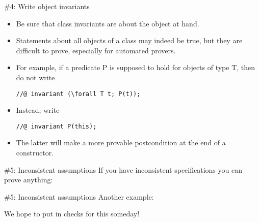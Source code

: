 \documentclass[
pdf,
nocolorBG,
slideColor,
cok,
]{prosper}
\newcommand{\verbatimcode}[1]{
\begin{figure*}
\tiny

\end{figure*}
}
\begin{document}
%%%%%%%%%%%%%%%%%%%%%%%%%%%%%%%%%%%%%%%%%%%%%%%%%%%%%%%%%%%%%%%%%%%%%%%%%%%%%

\begin{slide}{\#4: Write object invariants}
\vspace*{-6ex}
\begin{itemize}
\item Be sure that class invariants are about the object at hand.  
\item Statements about all objects of
a class may indeed be true, but they are difficult to prove, especially for automated provers.

\item For example, if a predicate P is supposed to hold for objects of type T, then do {\red not} write
\begin{verbatim}
//@ invariant (\forall T t; P(t));
\end{verbatim}

\item Instead, write
\begin{verbatim}
//@ invariant P(this);
\end{verbatim}

\item The latter will make a more provable postcondition at the end of a constructor.
\end{itemize}

\end{slide}


\begin{slide}{\#5: Inconsistent assumptions}
\vspace*{-3ex}
If you have inconsistent specifications you can prove anything:

\verbatimcode{examples/Inconsistent.java}
\end{slide}

\begin{slide}{\#5: Inconsistent assumptions}
\vspace*{-3ex}
Another example:

\verbatimcode{examples/Inconsistent2.java}

We hope to put in checks for this someday!

\end{slide}


\end{document}
